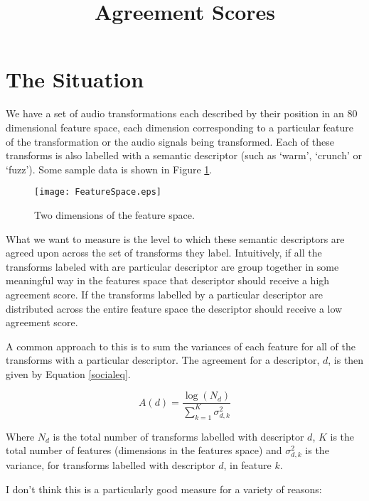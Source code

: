 \documentclass[a4paper]{article}
\title{Agreement Scores}
\author{}
\date{}
\begin{document}
\maketitle

\section*{The Situation}
We have a set of audio transformations each described by their position in an 80 dimensional feature space, each dimension
corresponding to a particular feature of the transformation or the audio signals being transformed. Each of these transforms
is also labelled with a semantic descriptor (such as `warm', `crunch' or `fuzz'). Some sample data is shown in Figure
\ref{FeatureSpace}.

	\begin{figure}
		\centering
		\texttt{[image: FeatureSpace.eps]}
		\caption{Two dimensions of the feature space.}
		\label{FeatureSpace}
	\end{figure}

What we want to measure is the level to which these semantic descriptors are agreed upon across the set of transforms they
label. Intuitively, if all the transforms labeled with are particular descriptor are group together in some meaningful way
in the features space that descriptor should receive a high agreement score. If the transforms labelled by a particular
descriptor are distributed across the entire feature space the descriptor should receive a low agreement score.

A common approach to this is to sum the variances of each feature for all of the transforms with a particular descriptor.
The agreement for a descriptor, $d$, is then given by Equation \ref{socialeq}.

	\begin{equation}
		A(d) = \frac{\log(N_{d})}{\sum_{k=1}^{K} \sigma_{d,k}^{2}}
		\label{socialeq}
	\end{equation}

Where $N_{d}$ is the total number of transforms labelled with descriptor $d$, $K$ is the total number of features
(dimensions in the features space) and $\sigma_{d,k}^{2}$ is the variance, for transforms labelled with descriptor $d$, in
feature $k$.

I don't think this is a particularly good measure for a variety of reasons:
\end{document}
